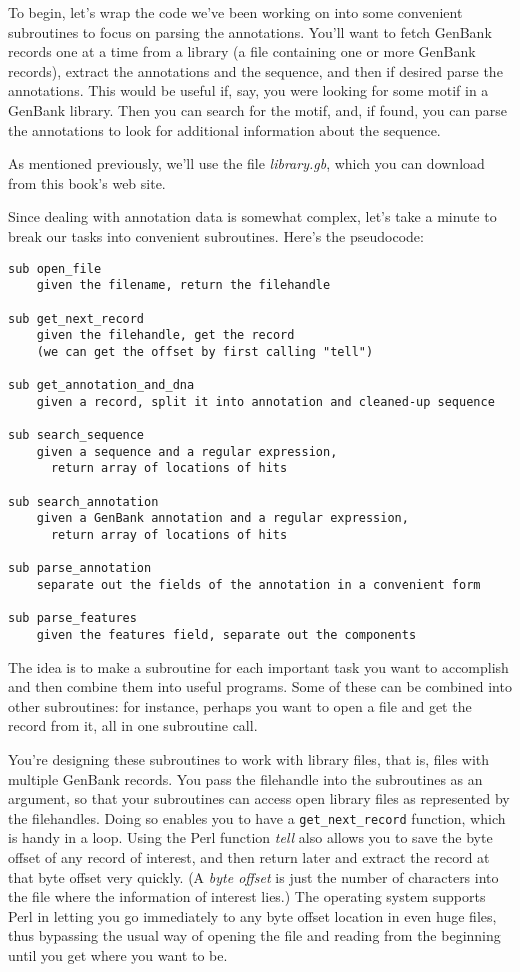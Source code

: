 To begin, let's wrap the code we've been working on into some convenient subroutines to focus on parsing the annotations. You'll want to fetch GenBank records one at a time from a library (a file containing one or more GenBank records), extract the annotations and the sequence, and then if desired parse the annotations. This would be useful if, say, you were looking for some motif in a GenBank library. Then you can search for the motif, and, if found, you can parse the annotations to look for additional information about the sequence.

As mentioned previously, we'll use the file \textit{library.gb}, which you can download from this book's web site.

Since dealing with annotation data is somewhat complex, let's take a minute to break our tasks into convenient subroutines. Here's the pseudocode: 

\begin{lstlisting}
sub open_file
    given the filename, return the filehandle

sub get_next_record
    given the filehandle, get the record
    (we can get the offset by first calling "tell")

sub get_annotation_and_dna
    given a record, split it into annotation and cleaned-up sequence

sub search_sequence
    given a sequence and a regular expression,
      return array of locations of hits

sub search_annotation
    given a GenBank annotation and a regular expression,
      return array of locations of hits

sub parse_annotation
    separate out the fields of the annotation in a convenient form

sub parse_features
    given the features field, separate out the components
\end{lstlisting}

The idea is to make a subroutine for each important task you want to accomplish and then combine them into useful programs. Some of these can be combined into other subroutines: for instance, perhaps you want to open a file and get the record from it, all in one subroutine call.

You're designing these subroutines to work with library files, that is, files with multiple GenBank records. You pass the filehandle into the subroutines as an argument, so that your subroutines can access open library files as represented by the filehandles. Doing so enables you to have a \verb|get_next_record| function, which is handy in a loop. Using the Perl function \textit{tell} also allows you to save the byte offset of any record of interest, and then return later and extract the record at that byte offset very quickly. (A \textit{byte offset} is just the number of characters into the file where the information of interest lies.) The operating system supports Perl in letting you go immediately to any byte offset location in even huge files, thus bypassing the usual way of opening the file and reading from the beginning until you get where you want to be.  

